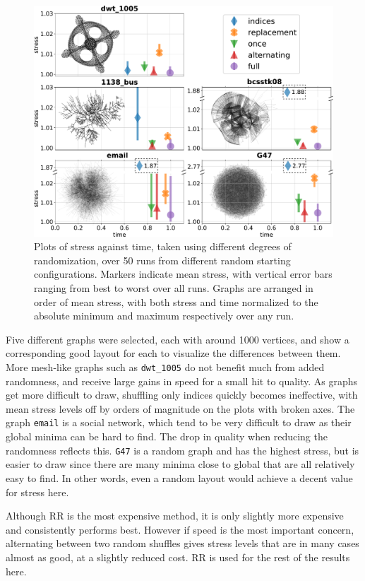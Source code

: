 \begin{figure}
  \centering
  \includegraphics[width=.9\textwidth]{stress/random.pdf}
  \caption[A comparison of methods for term order randomisation]{Plots of stress against time, taken using different degrees of randomization, over 50 runs from different random starting configurations. Markers indicate mean stress, with vertical error bars ranging from best to worst over all runs.
  Graphs are arranged in order of mean stress, with both stress and time normalized to the absolute minimum and maximum respectively over any run.
  }
  \label{fig:randomisation}
\end{figure}

Five different graphs were selected, each with around 1000 vertices, and show a corresponding good layout for each to visualize the differences between them.
More mesh-like graphs such as \texttt{dwt\_1005} do not benefit much from added randomness, and receive large gains in speed for a small hit to quality.
As graphs get more difficult to draw, shuffling only indices quickly becomes ineffective, with mean stress levels off by orders of magnitude on the plots with broken axes.
The graph \texttt{email} is a social network, which tend to be very difficult to draw as their global minima can be hard to find. The drop in quality when reducing the randomness reflects this. \texttt{G47} is a random graph and has the highest stress, but is easier to draw since there are many minima close to global that are all relatively easy to find. In other words, even a random layout would achieve a decent value for stress here.

Although RR is the most expensive method, it is only slightly more expensive and consistently performs best. However if speed is the most important concern, alternating between two random shuffles gives stress levels that are in many cases almost as good, at a slightly reduced cost.
RR is used for the rest of the results here.

